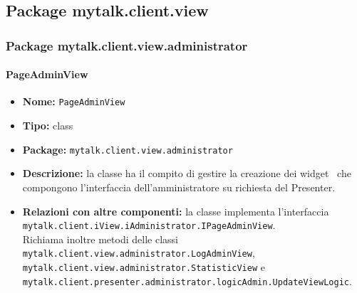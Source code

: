 \subsection{Package mytalk.client.view}{

\subsubsection{Package mytalk.client.view.administrator}{

\paragraph{PageAdminView}{
	\begin{itemize}
		\item [] \textbf{Nome:} \texttt{PageAdminView}
		\item [] \textbf{Tipo:} class
		\item [] \textbf{Package:} \texttt{mytalk.client.view.administrator}
		\item [] \textbf{Descrizione:} la classe ha il compito di gestire la creazione dei widget\g~ che compongono l'interfaccia dell'amministratore su richiesta del Presenter.
		\item [] \textbf{Relazioni con altre componenti:} la classe implementa l'interfaccia\\ \texttt{mytalk.client.iView.iAdministrator.IPageAdminView}.\\
		Richiama inoltre metodi delle classi
\texttt{mytalk.client.view.administrator.LogAdminView}, \\
\texttt{mytalk.client.view.administrator.StatisticView} e \\
\texttt{mytalk.client.presenter.administrator.logicAdmin.UpdateViewLogic}.
	\end{itemize}
}
}}
